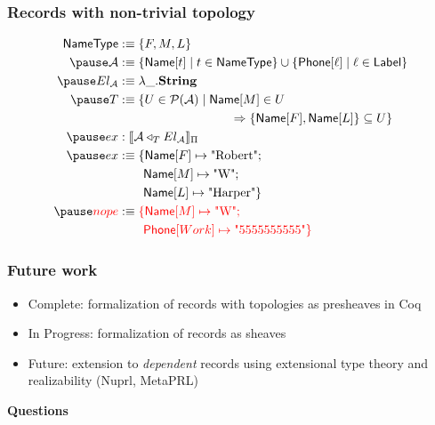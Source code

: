 \documentclass[tikz, 12pt]{beamer}
\begin{document}
\begin{frame}
  \frametitle{Records with non-trivial topology}\pause
  \[
    \begin{aligned}
      \mathsf{NameType} &:\equiv \{ F, M, L \}\\\pause
      \mathcal{A} &:\equiv \{ \mathsf{Name}[t] \mid t\in\mathsf{NameType}\}
        \cup
        \{ \mathsf{Phone}[\ell] \mid \ell\in\mathsf{Label} \}\\\pause
      El_\mathcal{A} &:\equiv \lambda\_. \mathbf{String}\\\pause
      T &:\equiv \{ U\in\mathcal{P}(\mathcal{A}) \mid \mathsf{Name}[M]\in U\\&\hspace{90pt}\Rightarrow \{\mathsf{Name}[F],\mathsf{Name}[L]\}\subseteq U\}\\\pause
      ex &: \llbracket\mathcal{A}\triangleleft_T El_\mathcal{A}\rrbracket_\Pi\\\pause
      ex &:\equiv
        \{\mathsf{Name}[F]\mapsto \text{"Robert"};\\
          &\qquad \mathsf{Name}[M]\mapsto\text{"W"};\\
          &\qquad \mathsf{Name}[L]\mapsto\text{"Harper"}\}\\\pause
      \color{red}{nope} &:\equiv\color{red}{\{\mathsf{Name}[M]\mapsto\text{"W"};}\\
          &\qquad \color{red}{\mathsf{Phone}[Work]\mapsto\text{"5555555555"}\}}
    \end{aligned}
  \]
\end{frame}

\begin{frame}
  \frametitle{Future work}\pause
  \begin{itemize}
    \item Complete: formalization of records with topologies as presheaves in Coq\pause
    \item In Progress: formalization of records as sheaves\pause
    \item Future: extension to \emph{dependent} records using extensional type theory and realizability (Nuprl, MetaPRL)
  \end{itemize}
\end{frame}

\begin{frame}
  \centerline{\textbf{Questions}}
\end{frame}
\end{document}
